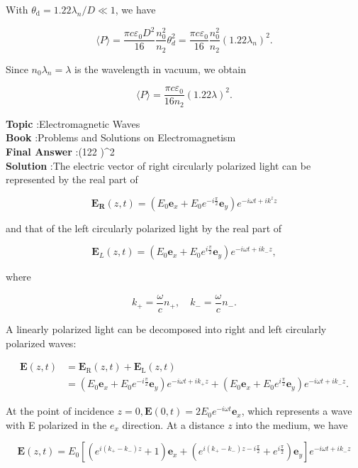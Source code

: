 \documentclass[10pt]{article}
\begin{document}
With $\theta_{\mathrm{d}}=1.22 \lambda_{n} / D \ll 1$, we have

$$
\langle P\rangle=\frac{\pi c \varepsilon_{0} D^{2}}{16} \frac{n_{0}^{2}}{n_{2}} \theta_{d}^{2}=\frac{\pi c \varepsilon_{0}}{16} \frac{n_{0}^{2}}{n_{2}}\left(1.22 \lambda_{n}\right)^{2} .
$$

Since $n_{0} \lambda_{n}=\lambda$ is the wavelength in vacuum, we obtain

$$
\langle P\rangle=\frac{\pi c \varepsilon_{0}}{16 n_{2}}(1.22 \lambda)^{2} .
$$

\textbf{Topic} :Electromagnetic Waves\\
\textbf{Book} :Problems and Solutions on Electromagnetism\\
\textbf{Final Answer} :(122 \lambda)^{2}\\


\textbf{Solution} :The electric vector of right circularly polarized light can be represented by the real part of

$$
\mathbf{E}_{\mathbf{R}}(z, t)=\left(E_{0} \mathbf{e}_{x}+E_{0} e^{-i \frac{\pi}{2}} \mathbf{e}_{y}\right) e^{-i \omega t+i k^{z} z}
$$

and that of the left circularly polarized light by the real part of

$$
\mathbf{E}_{L}(z, t)=\left(E_{0} \mathbf{e}_{x}+E_{0} e^{i \frac{\pi}{2}} \mathbf{e}_{y}\right) e^{-i \omega t+i k_{-} z},
$$

where

$$
k_{+}=\frac{\omega}{c} n_{+}, \quad k_{-}=\frac{\omega}{c} n_{-} .
$$

 A linearly polarized light can be decomposed into right and left circularly polarized waves:

$$
\begin{aligned}
\mathbf{E}(z, t) &=\mathbf{E}_{\mathrm{R}}(z, t)+\mathbf{E}_{\mathrm{L}}(z, t) \\
&=\left(E_{0} \mathbf{e}_{x}+E_{0} e^{-i \frac{\pi}{2}} \mathbf{e}_{y}\right) e^{-i \omega t+i k_{+} z}+\left(E_{0} \mathbf{e}_{x}+E_{0} e^{i \frac{\pi}{2}} \mathbf{e}_{y}\right) e^{-i \omega t+i k_{-} z} .
\end{aligned}
$$

At the point of incidence $z=0, \mathbf{E}(0, t)=2 E_{0} e^{-i \omega t} \mathbf{e}_{x}$, which represents a wave with E polarized in the $e_{x}$ direction. At a distance $z$ into the medium, we have

$$
\mathbf{E}(z, t)=E_{0}\left[\left(e^{i\left(k_{+}-k_{-}\right) z}+1\right) \mathbf{e}_{x}+\left(e^{i\left(k_{+}-k_{-}\right) z-i \frac{\pi}{2}}+e^{i \frac{\pi}{2}}\right) \mathbf{e}_{y}\right] e^{-i \omega t+i k_{-} z}
$$
\end{document}

